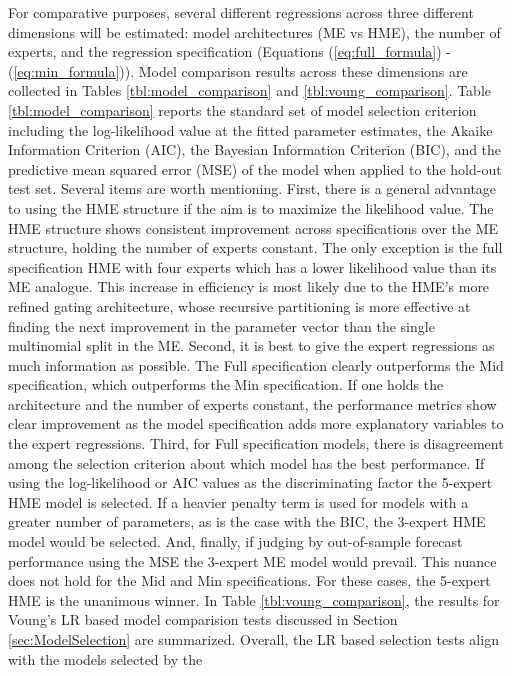 \documentclass[12pt]{article}
\theoremstyle{definition}
\begin{document}
For comparative purposes, several different regressions across three
different dimensions will be estimated: model architectures (ME vs HME), the number of experts,
and the regression specification (Equations (\ref{eq:full_formula}) -
(\ref{eq:min_formula})). Model comparison results across these dimensions
are collected in Tables \ref{tbl:model_comparison} and \ref{tbl:voung_comparison}.
Table \ref{tbl:model_comparison} reports the standard set of model selection criterion
including the log-likelihood value at the fitted parameter estimates, the Akaike
Information Criterion (AIC), the Bayesian Information Criterion (BIC), and the
predictive mean squared error (MSE) of the model when applied to the hold-out test set.
Several items are worth mentioning. First, there is a general advantage
to using the HME structure if the aim is to maximize the
likelihood value. The HME structure shows consistent improvement
across specifications over the ME structure, holding the number of experts
constant. The only exception is the full specification HME with four experts which
has a lower likelihood value than its ME analogue. This increase in efficiency
is most likely due to the HME's more refined gating architecture, whose recursive
partitioning is more effective at finding the next improvement in the parameter
vector than the single multinomial split in the ME. Second, it is best to give the expert
regressions as much information as possible. The Full specification clearly outperforms
the Mid specification, which outperforms the Min specification. If one holds the
architecture and the number of experts constant, the performance metrics show clear
improvement as the model specification adds more explanatory variables to the expert
regressions. Third, for Full specification models, there is
disagreement among the selection criterion about which model has the best performance.
If using the log-likelihood or AIC values as the discriminating factor the 5-expert HME
model is selected. If a heavier penalty term is used for models with a greater number
of parameters, as is the case with the BIC, the 3-expert HME model would be selected.
And, finally, if judging by out-of-sample forecast performance using the MSE the 3-expert
ME model would prevail. This nuance does not hold for the Mid and Min specifications.
For these cases, the 5-expert HME is the unanimous winner. In Table \ref{tbl:voung_comparison},
the results for Voung's LR based model comparision tests discussed in Section \ref{sec:ModelSelection}
are summarized. Overall, the LR based selection tests align with the models selected by the
\end{document}
